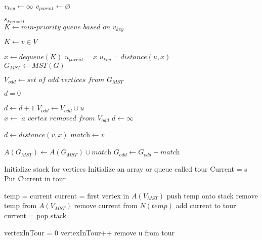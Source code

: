 \documentclass{article}
\begin{document}
  \begin{algorithmic}[1]

      \State $v_{\textit{key}} \gets \infty$
      \State $v_{\textit{parent}} \gets \varnothing$
    \EndFor

    \State $s_{\textit{key} = 0}$
    \\
    \State $K \gets \textit{min-priority queue based on } v_{\textit{key}}$

    \State $K \gets {v \in V}$

      \State $x \gets \textit{dequeue}(K)$
          \State $u_{\textit{parent}} = x$
          \State $u_{\textit{key}} = \textit{distance}(u, x)$
        \EndIf
      \EndFor
    \EndWhile
    \\
    \State $G_{MST} \gets \textit{MST}(G)$

    \State $V_{\textit{odd}} \gets \textit{set of odd vertices from }G_{MST}$

      \State $d = 0$

        \State $d \gets d + 1$
          \State $V_{\textit{odd}} \gets V_{\textit{odd}} \cup u$
        \EndIf
      \EndFor
    \EndFor
    \\
      \State $x \gets \textit{ a vertex removed from } V_{\textit{odd}}$
      \State $d \gets \infty$


          \State $d \gets \textit{distance}(v, x)$
          \State $\textit{match} \gets v$
        \EndIf

        \State $A(G_{MST}) \gets A(G_{MST}) \cup \textit{match}$
        \State $G_{\textit{odd}} \gets G_{\textit{odd}} - \textit{match}$

      \EndFor

    \EndWhile

    \State Initialize stack for vertices
    \State Initialize an array or queue called tour
    \State Current = s
    \State Put Current in tour

        \State temp = current
        \State current = first vertex in $A(V_{MST})$
        \State push temp onto stack
        \State remove temp from $A(V_{MST})$
        \State remove current from $N(temp)$
      \Else
        \State add current to tour
        \State current = pop stack
      \EndIf
    \EndWhile

      \State vertexInTour = 0
          \State vertexInTour++
        \EndIf
          \State remove u from tour
        \EndIf
      \EndFor
    \EndFor
    \EndProcedure
  \end{algorithmic}
\FloatBarrier
\end{document}
